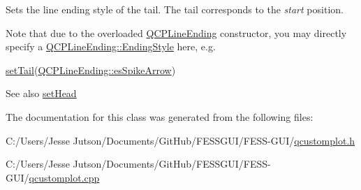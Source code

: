 Sets the line ending style of the tail. The tail corresponds to the {\itshape start} position.

Note that due to the overloaded \hyperlink{class_q_c_p_line_ending}{Q\+C\+P\+Line\+Ending} constructor, you may directly specify a \hyperlink{class_q_c_p_line_ending_a5ef16e6876b4b74959c7261d8d4c2cd5}{Q\+C\+P\+Line\+Ending\+::\+Ending\+Style} here, e.\+g.
\begin{DoxyCode}
\hyperlink{class_q_c_p_item_curve_ac3488d8b1a6489c845dc5bff3ef71124}{setTail}(\hyperlink{class_q_c_p_line_ending_a5ef16e6876b4b74959c7261d8d4c2cd5ab9964d0d03f812d1e79de15edbeb2cbf}{QCPLineEnding::esSpikeArrow}) 
\end{DoxyCode}


\begin{DoxySeeAlso}{See also}
\hyperlink{class_q_c_p_item_curve_a08a30d9cdd63995deea3d9e20430676f}{set\+Head} 
\end{DoxySeeAlso}


The documentation for this class was generated from the following files\+:\begin{DoxyCompactItemize}
\item 
C\+:/\+Users/\+Jesse Jutson/\+Documents/\+Git\+Hub/\+F\+E\+S\+S\+G\+U\+I/\+F\+E\+S\+S-\/\+G\+U\+I/\hyperlink{qcustomplot_8h}{qcustomplot.\+h}\item 
C\+:/\+Users/\+Jesse Jutson/\+Documents/\+Git\+Hub/\+F\+E\+S\+S\+G\+U\+I/\+F\+E\+S\+S-\/\+G\+U\+I/\hyperlink{qcustomplot_8cpp}{qcustomplot.\+cpp}\end{DoxyCompactItemize}
